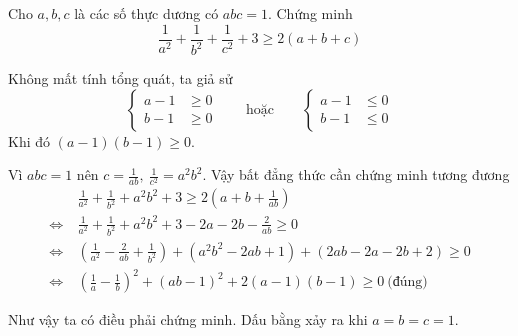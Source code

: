 \begin{problem}
    Cho $a, b, c$ là các số thực dương có $abc = 1$. Chứng minh
    $$
        \frac{1}{a^2} + \frac{1}{b^2} + \frac{1}{c^2} + 3 \ge 2(a + b + c)
    $$ 
    \solution

    Không mất tính tổng quát, ta giả sử 
    $$
        \begin{cases}
            a - 1 &\ge 0 \\ 
            b - 1 &\ge 0
        \end{cases}
        \quad \quad \text{hoặc} \quad \quad
        \begin{cases}
            a - 1 &\le 0 \\ 
            b - 1 &\le 0
        \end{cases}
    $$
    Khi đó $(a - 1)(b - 1) \ge 0$.
    
    Vì $abc = 1$ nên $\displaystyle c = \frac{1}{ab},\ \frac{1}{c^2} = a^2 b^2$. Vậy bất đẳng thức cần chứng minh tương đương
    \begin{align*}
        &\frac{1}{a^2} + \frac{1}{b^2} + a^2 b^2 + 3 \ge 2\left(a + b + \frac{1}{ab}\right) \\
        \Leftrightarrow \ &\frac{1}{a^2} + \frac{1}{b^2} + a^2 b^2 + 3 - 2a - 2b - \frac{2}{ab} \ge 0 \\
        \Leftrightarrow \ &\left(\frac{1}{a^2} - \frac{2}{ab} + \frac{1}{b^2}\right) + (a^2 b^2 - 2ab + 1) + (2ab - 2a - 2b + 2) \ge 0 \\
        \Leftrightarrow \ &\left(\frac{1}{a} - \frac{1}{b}\right)^2 + (ab - 1)^2 + 2(a - 1)(b - 1) \ge 0 \ \text{(đúng)}
    \end{align*}

    Như vậy ta có điều phải chứng minh. Dấu bằng xảy ra khi $a = b = c = 1$.

\end{problem}